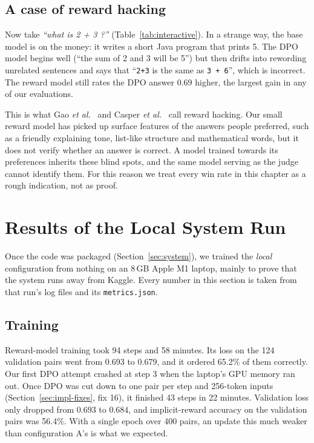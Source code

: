 \subsection{A case of reward hacking}
\label{sec:hacking}
Now take \emph{``what is 2 + 3 ?''} (Table~\ref{tab:interactive}). In a strange way, the base model is on the money: it writes a short Java program that prints 5. The DPO model begins well (``the sum of 2 and 3 will be 5'') but then drifts into rewording unrelated sentences and says that ``\texttt{2+3} is the same as \texttt{3 + 6}'', which is incorrect. The reward model still rates the DPO answer $0.69$ higher, the largest gain in any of our evaluations.

This is what Gao \emph{et al.}~\cite{gao2023overoptimization} and Casper \emph{et al.}~\cite{casper2023open} call reward hacking. Our small reward model has picked up surface features of the answers people preferred, such as a friendly explaining tone, list-like structure and mathematical words, but it does not verify whether an answer is correct. A model trained towards its preferences inherits these blind spots, and the same model serving as the judge cannot identify them. For this reason we treat every win rate in this chapter as a rough indication, not as proof.

\section{Results of the Local System Run}
\label{sec:local}

Once the code was packaged (Section~\ref{sec:system}), we trained the \emph{local} configuration from nothing on an 8\,GB Apple M1 laptop, mainly to prove that the system runs away from Kaggle. Every number in this section is taken from that run's log files and its \texttt{metrics.json}.

\subsection{Training}
Reward-model training took 94 steps and 58 minutes. Its loss on the 124 validation pairs went from $0.693$ to $0.679$, and it ordered 65.2\% of them correctly. Our first DPO attempt crashed at step 3 when the laptop's GPU memory ran out. Once DPO was cut down to one pair per step and 256-token inputs (Section~\ref{sec:impl-fixes}, fix 16), it finished 43 steps in 22 minutes. Validation loss only dropped from $0.693$ to $0.684$, and implicit-reward accuracy on the validation pairs was 56.4\%. With a single epoch over 400 pairs, an update this much weaker than configuration A's is what we expected.

